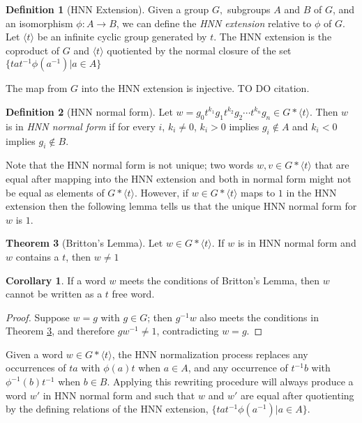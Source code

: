 \documentclass[12pt]{article} %
\theoremstyle{definition}
\newtheorem{theorem}{Theorem}[section]
\theoremstyle{definition}
\newtheorem{corol}{Corollary}[theorem]
\theoremstyle{definition}
\theoremstyle{definition}
\theoremstyle{definition}
\newtheorem{defn}[theorem]{Definition}
\theoremstyle{definition}
\begin{document}
\begin{defn}[HNN Extension]
  Given a group $G,$ subgroups $A$ and $B$ of $G$, and an isomorphism $\phi: A \to B$, we can define
  the \textit{HNN extension} relative to $\phi$ of $G$. Let $\langle t \rangle$ be an infinite cyclic
  group generated by $t$. The HNN extension is the coproduct
  of $G$ and $\langle t \rangle$ quotiented
  by the normal closure of the set $\{ta t^{-1} \phi(a^{-1}) | a \in A\}$
\end{defn}

The map from $G$ into the HNN extension is injective. TO DO citation.

\begin{defn}[HNN normal form]\label{HNNnormalform}
  Let $w = g_0t^{k_1}g_1t^{k_2}g_2 \cdots t^{k_n}g_n \in G \ast \langle t \rangle$.
  Then $w$ is in \textit{HNN normal form} if for every $i$, $k_i \ne 0$, $k_i > 0$
  implies $g_i \notin A$ and $k_i < 0$ implies $g_i \notin B$.
\end{defn}

Note that the HNN normal form is not unique; two words $w, v \in G \ast \langle t \rangle$
that are equal after mapping into the HNN extension and both in normal form might not be
equal as elements of $G \ast \langle t \rangle$. However, if $w \in G \ast \langle t \rangle $
maps to $1$ in the HNN extension
then the following lemma tells us that the unique HNN normal form for $w$ is $1$.

\begin{theorem}[Britton's Lemma]\label{britton}
  Let $w \in G \ast \langle t \rangle$.
  If $w$ is in HNN normal form and $w$ contains a $t$, then $w \ne 1$
  \cite{CharlesF.Miller1968OBTA}
\end{theorem}

\begin{corol}\label{genbritton}
  If a word $w$ meets the conditions of Britton's Lemma,
  then $w$ cannot be written as a $t$ free word.
\end{corol}
\begin{proof}
Suppose $w = g$ with $g \in G$;
then $g^{-1}w$ also meets the conditions
in Theorem \ref{britton}, and therefore $gw^{-1}\ne 1$, contradicting $w = g$.
\end{proof}
Given a word $w \in G \ast \langle t \rangle$, the HNN normalization process
replaces any occurrences of $ta$ with $\phi(a)t$ when $a \in A$, and
any occurrence of $t^{-1}b$ with $\phi^{-1}(b)t^{-1}$ when $b \in B$.
Applying this rewriting procedure will always produce a word $w'$ in HNN normal form and
such that $w$ and $w'$ are equal after quotienting by the defining relations
of the HNN extension, $\{ta t^{-1} \phi(a^{-1}) | a \in A\}$.
\end{document}
